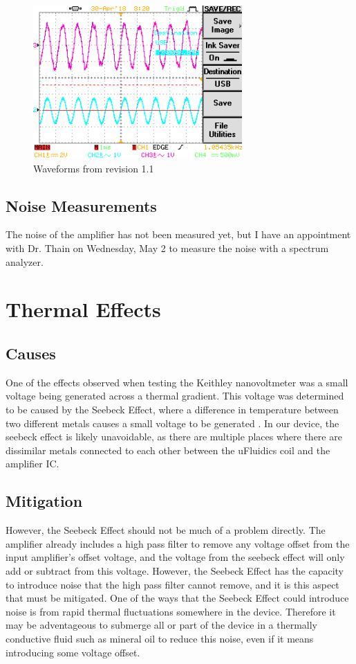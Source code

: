 \documentclass[10pt, journal]{IEEEtran}
\begin{document}
\begin{figure}[ht!]
  \includegraphics[width=8cm]{../photos/output.png}
  \caption{Waveforms from revision 1.1}
  \label{fig:ampout}
\end{figure}

\subsection{Noise Measurements}
The noise of the amplifier has not been measured yet, but I have an 
appointment with Dr. Thain on Wednesday, May 2 to measure the noise
with a spectrum analyzer.

\section{Thermal Effects}
\subsection{Causes}
One of the effects observed when testing the Keithley nanovoltmeter
was a small voltage being generated across a thermal gradient. This
voltage was determined to be caused by the Seebeck Effect, where a
difference in temperature between two different metals causes a small
voltage to be generated \cite{seebeck}. In our device, the seebeck
effect is likely unavoidable, as there are multiple places where there
are dissimilar metals connected to each other between the uFluidics
coil and the amplifier IC.

\subsection{Mitigation}
However, the Seebeck Effect should not be much of a problem
directly. The amplifier already includes a high pass filter to remove
any voltage offset from the input amplifier's offset voltage, and the
voltage from the seebeck effect will only add or subtract from this
voltage. However, the Seebeck Effect has the capacity to introduce
noise that the high pass filter cannot remove, and it is this aspect
that must be mitigated. One of the ways that the Seebeck Effect could
introduce noise is from rapid thermal fluctuations somewhere in the
device. Therefore it may be adventageous to submerge all or part of
the device in a thermally conductive fluid such as mineral oil to
reduce this noise, even if it means introducing some voltage offset.
\end{document}
